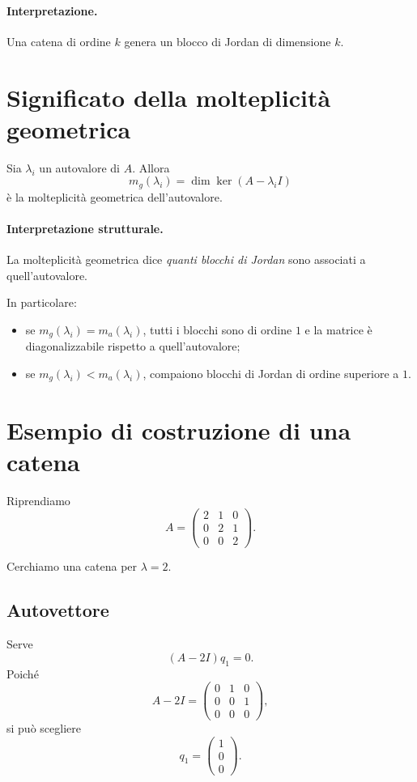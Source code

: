 \paragraph{Interpretazione.}
Una catena di ordine $k$ genera un blocco di Jordan di dimensione $k$.

\section{Significato della molteplicità geometrica}

Sia $\lambda_i$ un autovalore di $A$. Allora
\[
m_g(\lambda_i)=\dim\ker(A-\lambda_i I)
\]
è la molteplicità geometrica dell'autovalore.

\paragraph{Interpretazione strutturale.}
La molteplicità geometrica dice \emph{quanti blocchi di Jordan} sono associati a quell'autovalore.

In particolare:
\begin{itemize}
    \item se $m_g(\lambda_i)=m_a(\lambda_i)$, tutti i blocchi sono di ordine $1$ e la matrice è diagonalizzabile rispetto a quell'autovalore;
    \item se $m_g(\lambda_i)<m_a(\lambda_i)$, compaiono blocchi di Jordan di ordine superiore a $1$.
\end{itemize}

\section{Esempio di costruzione di una catena}

Riprendiamo
\[
A=
\begin{pmatrix}
2 & 1 & 0\\
0 & 2 & 1\\
0 & 0 & 2
\end{pmatrix}.
\]

Cerchiamo una catena per $\lambda=2$.

\subsection{Autovettore}

Serve
\[
(A-2I)q_1=0.
\]
Poiché
\[
A-2I=
\begin{pmatrix}
0 & 1 & 0\\
0 & 0 & 1\\
0 & 0 & 0
\end{pmatrix},
\]
si può scegliere
\[
q_1=
\begin{pmatrix}
1\\
0\\
0
\end{pmatrix}.
\]


